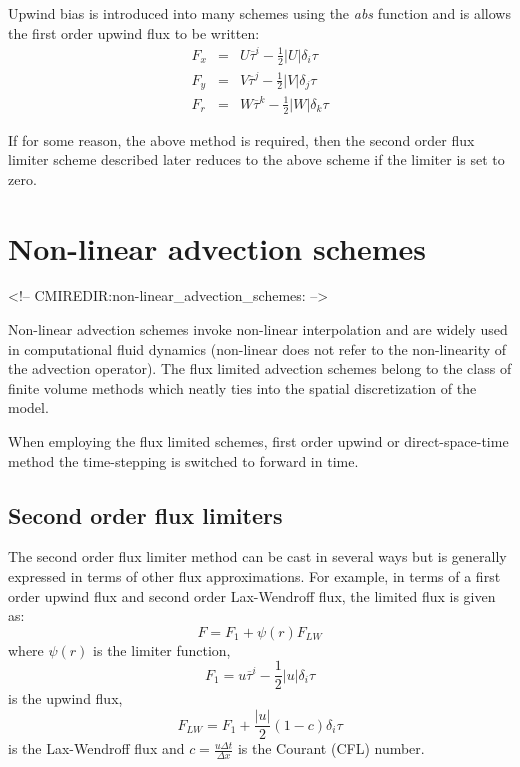 Upwind bias is introduced into many schemes using the {\em abs}
function and is allows the first order upwind flux to be written:
\begin{eqnarray}
F_x & = & U \overline{ \tau }^i - \frac{1}{2} |U| \delta_i \tau \\
F_y & = & V \overline{ \tau }^j - \frac{1}{2} |V| \delta_j \tau \\
F_r & = & W \overline{ \tau }^k - \frac{1}{2} |W| \delta_k \tau
\end{eqnarray}

If for some reason, the above method is required, then the second
order flux limiter scheme described later reduces to the above scheme
if the limiter is set to zero.


\section{Non-linear advection schemes}
\label{sec:non-linear_advection_schemes}
\begin{rawhtml}
<!-- CMIREDIR:non-linear_advection_schemes: -->
\end{rawhtml}

Non-linear advection schemes invoke non-linear interpolation and are
widely used in computational fluid dynamics (non-linear does not refer
to the non-linearity of the advection operator). The flux limited
advection schemes belong to the class of finite volume methods which
neatly ties into the spatial discretization of the model.

When employing the flux limited schemes, first order upwind or
direct-space-time method the time-stepping is switched to forward in
time.

\subsection{Second order flux limiters}

The second order flux limiter method can be cast in several ways but
is generally expressed in terms of other flux approximations. For
example, in terms of a first order upwind flux and second order
Lax-Wendroff flux, the limited flux is given as:
\begin{equation}
F = F_1 + \psi(r) F_{LW}
\end{equation}
where $\psi(r)$ is the limiter function,
\begin{equation}
F_1 = u \overline{\tau}^i - \frac{1}{2} |u| \delta_i \tau
\end{equation}
is the upwind flux,
\begin{equation}
F_{LW} = F_1 + \frac{|u|}{2} (1-c) \delta_i \tau
\end{equation}
is the Lax-Wendroff flux and $c = \frac{u \Delta t}{\Delta x}$ is the
Courant (CFL) number.

